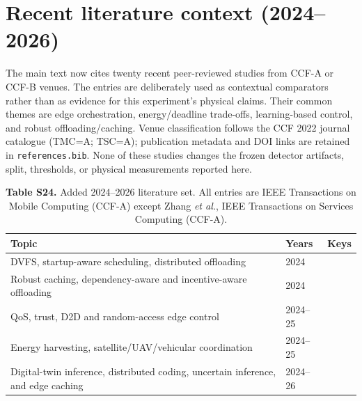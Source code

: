 \documentclass[10pt,a4paper]{article}
\begin{document}
\clearpage
\section{Recent literature context (2024--2026)}
The main text now cites twenty recent peer-reviewed studies from CCF-A or CCF-B venues. The entries are deliberately used as contextual comparators rather than as evidence for this experiment's physical claims. Their common themes are edge orchestration, energy/deadline trade-offs, learning-based control, and robust offloading/caching. Venue classification follows the CCF 2022 journal catalogue (TMC=A; TSC=A); publication metadata and DOI links are retained in \texttt{references.bib}. None of these studies changes the frozen detector artifacts, split, thresholds, or physical measurements reported here.

\begin{table}[h!]
\centering\scriptsize
\caption*{\textbf{Table S24.} Added 2024--2026 literature set. All entries are IEEE Transactions on Mobile Computing (CCF-A) except Zhang \emph{et al.}, IEEE Transactions on Services Computing (CCF-A).}
\begin{tabular}{p{}ll}
\toprule
Topic & Years & Keys\\\midrule
DVFS, startup-aware scheduling, distributed offloading & 2024 & \cite{Zhang2024DVFO,Lou2024Startup,Kim2024DistributedOffload}\\
Robust caching, dependency-aware and incentive-aware offloading & 2024 & \cite{Chen2024ABR,Feng2024PRAISE,Tutuncuoglu2024Serverless,Hu2024MICDA}\\
QoS, trust, D2D and random-access edge control & 2024--25 & \cite{Maleki2024QCS,Wang2025TrustOffload,Hu2025SITOff,Han2025OffloadingGame}\\
Energy harvesting, satellite/UAV/vehicular coordination & 2024--25 & \cite{Zhang2024Satellite,Luo2025SolarEdge,Gong2025UAV3D,Zhao2025COHCTO}\\
Digital-twin inference, distributed coding, uncertain inference, and edge caching & 2024--26 & \cite{Zhang2024AoI,Qiu2026Barycentric,Nan2026RobustDNN,Luo2025EdgeCache,Li2024FIMI}\\
\bottomrule
\end{tabular}
\end{table}
\end{document}
